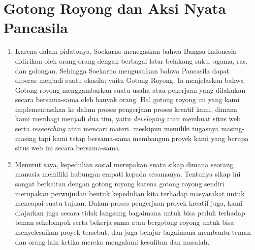 \documentclass[12pt]{article}
\begin{document}
\pagebreak

\section{Gotong Royong dan Aksi Nyata Pancasila}
\begin{enumerate}[label=\alph*)]
  \item
    Karena dalam pidatonya, Soekarno menegaskan bahwa Bangsa Indonesia 
    didirikan oleh orang-orang dengan berbagai latar belakang suku, agama, ras,
    dan golongan. Sehingga Soekarno mengusulkan bahwa Pancasila dapat diperas 
    menjadi suatu ekasila; yaitu Gotong Royong. Ia menjelaskan bahwa
    Gotong royong menggambarkan suatu usaha atau pekerjaan yang dilakukan secara
    bersama-sama oleh banyak orang. Hal gotong royong ini yang kami implementasikan
    ke dalam  proses pengerjaan proses kreatif kami, dimana kami membagi menjadi dua tim,
    yaitu \emph{developing} atau membuat situs web serta \emph{researching} atau
    mencari materi. meskipun memiliki tugasnya masing-masing tapi kami
    tetap bersama-sama membangun proyek kami yang berupa situs web ini secara
    bersama-sama.
  \item
    Menurut saya, kepedulian sosial merupakan suatu sikap dimana seorang
    manusia memiliki hubungan empati kepada sesamanya. Tentunya sikap ini
    sangat berkaitan dengan gotong royong karena gotong royong sendiri
    merupakan perwujudan bentuk kepedulian kita terhadap masyarakat
    untuk mencapai suatu tujuan. Dalam proses pengerjaan proyek kreatif juga,
    kami diajarkan juga secara tidak langsung bagaimana untuk bisa peduli
    terhadap teman sekelompok serta bekerja sama atau bergotong royong untuk
    bisa menyelesaikan proyek tersebut, dan juga belajar bagaimana membantu
    teman dan orang lain ketika mereka mengalami kesulitan dan masalah.
\end{enumerate}

\pagebreak
\end{document}
